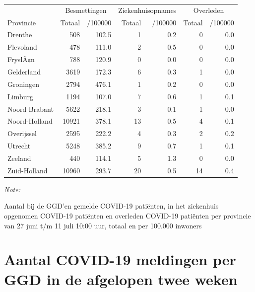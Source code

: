 \documentclass[
  english,
  man,floatsintext]{apa6}
\begin{document}
\begin{table}
\centering
\begin{threeparttable}
\begin{tabular}{lrrrrrr}
\toprule
\multicolumn{1}{c}{ } & \multicolumn{2}{c}{Besmettingen} & \multicolumn{2}{c}{Ziekenhuisopnames} & \multicolumn{2}{c}{Overleden} \\
\cmidrule(l{3pt}r{3pt}){2-3} \cmidrule(l{3pt}r{3pt}){4-5} \cmidrule(l{3pt}r{3pt}){6-7}
Provincie & Totaal & /100000 & Totaal & /100000 & Totaal & /100000\\
\midrule
Drenthe & 508 & 102.5 & 1 & 0.2 & 0 & 0.0\\
Flevoland & 478 & 111.0 & 2 & 0.5 & 0 & 0.0\\
FryslÃ¢n & 788 & 120.9 & 0 & 0.0 & 0 & 0.0\\
Gelderland & 3619 & 172.3 & 6 & 0.3 & 1 & 0.0\\
Groningen & 2794 & 476.1 & 1 & 0.2 & 0 & 0.0\\
Limburg & 1194 & 107.0 & 7 & 0.6 & 1 & 0.1\\
Noord-Brabant & 5622 & 218.1 & 3 & 0.1 & 1 & 0.0\\
Noord-Holland & 10921 & 378.1 & 13 & 0.5 & 4 & 0.1\\
Overijssel & 2595 & 222.2 & 4 & 0.3 & 2 & 0.2\\
Utrecht & 5248 & 385.2 & 9 & 0.7 & 1 & 0.1\\
Zeeland & 440 & 114.1 & 5 & 1.3 & 0 & 0.0\\
Zuid-Holland & 10960 & 293.7 & 20 & 0.5 & 14 & 0.4\\
\bottomrule
\end{tabular}
\begin{tablenotes}
\item \textit{Note: } 
\item Aantal bij de GGD’en gemelde COVID-19 patiënten, in het ziekenhuis opgenomen COVID-19 patiënten en overleden COVID-19 patiënten per provincie van 27 juni t/m 11 juli 10:00 uur, totaal en per 100.000 inwoners
\end{tablenotes}
\end{threeparttable}
\end{table}

\newpage

\hypertarget{aantal-covid-19-meldingen-per-ggd-in-de-afgelopen-twee-weken}{%
\section{Aantal COVID-19 meldingen per GGD in de afgelopen twee weken}\label{aantal-covid-19-meldingen-per-ggd-in-de-afgelopen-twee-weken}}
\end{document}
